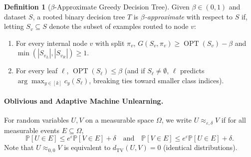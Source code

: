 \documentclass[11pt]{article}
\theoremstyle{definition}
\newtheorem{definition}{Definition}
\newcommand{\Prob}{\mathbb{P}}
\newcommand{\TV}{d_{\mathrm{TV}}}
\newcommand{\OPT}{\operatorname{OPT}}
\begin{document}
\begin{definition}[$\beta$-Approximate Greedy Decision Tree]
Given $\beta \in (0, 1)$ and dataset $S$, a rooted binary decision tree $T$ is \emph{$\beta$-approximate} with respect to $S$ if, letting $S_v \subseteq S$ denote the subset of examples routed to node $v$:
\begin{enumerate}[leftmargin=1.5em,itemsep=2pt]
    \item For every internal node $v$ with split $\pi_v$, $G(S_v, \pi_v) \ge \OPT(S_v) - \beta$ and $\min(|S_{v_L}|, |S_{v_R}|) \ge 1$.
    \item For every leaf $\ell$, $\OPT(S_\ell) \le \beta$ (and if $S_\ell \ne \emptyset$, $\ell$ predicts $\arg\max_{y \in [k]} c_y(S_\ell)$, breaking ties toward smaller class indices).
\end{enumerate}
\end{definition}

\paragraph{Oblivious and Adaptive Machine Unlearning.}
For random variables $U, V$ on a measurable space $\Omega$, we write $U \approx_{\varepsilon, \delta} V$ if for all measurable events $E \subseteq \Omega$,
\[
    \Prob[U \in E] \le e^\varepsilon \Prob[V \in E] + \delta \quad \text{and} \quad \Prob[V \in E] \le e^\varepsilon \Prob[U \in E] + \delta.
\]
Note that $U \approx_{0, 0} V$ is equivalent to $\TV(U, V) = 0$ (identical distributions).
\end{document}
